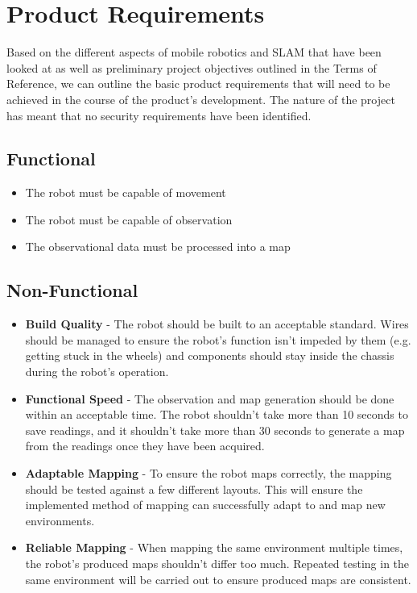 		\chapter{Product Requirements}
		\label{requirements}
		Based on the different aspects of mobile robotics and SLAM that have been looked at as well as preliminary project objectives outlined in the Terms of Reference, we can outline the basic product requirements that will need to be achieved in the course of the product's development. The nature of the project has meant that no security requirements have been identified.
		
			\section{Functional}
			\label{requirements:functional}
			\begin{itemize}
				\item The robot must be capable of movement
				\item The robot must be capable of observation
				\item The observational data must be processed into a map
			\end{itemize}
			
			\section{Non-Functional}
			\label{requirements:nonfunctional}
			\begin{itemize}
				\item \textbf{Build Quality} - The robot should be built to an acceptable standard. Wires should be managed to ensure the robot's function isn't impeded by them (e.g. getting stuck in the wheels) and components should stay inside the chassis during the robot's operation.
				\item \textbf{Functional Speed} - The observation and map generation should be done within an acceptable time. The robot shouldn't take more than 10 seconds to save readings, and it shouldn't take more than 30 seconds to generate a map from the readings once they have been acquired.
				\item \textbf{Adaptable Mapping} - To ensure the robot maps correctly, the mapping should be tested against a few different layouts. This will ensure the implemented method of mapping can successfully adapt to and map new environments.
				\item \textbf{Reliable Mapping} - When mapping the same environment multiple times, the robot's produced maps shouldn't differ too much. Repeated testing in the same environment will be carried out to ensure produced maps are consistent.
			\end{itemize}
		

